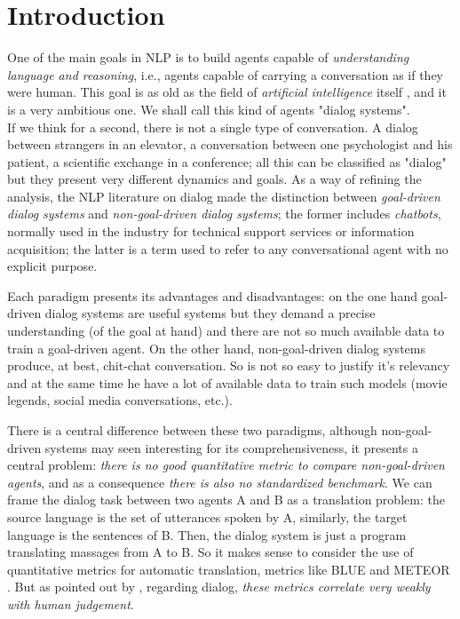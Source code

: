 \chapter{Introduction}
\label{ch:01-introduction}

One of the main goals in NLP is to build agents capable of \textit{understanding language and reasoning}, i.e., agents capable of carrying a conversation as if they were human. This goal is as old as the field of \textit{artificial intelligence} itself \cite{Turing}, and it is a very ambitious one. We shall call this kind of agents "dialog systems".\\

If we think for a second, there is not a single type of conversation. A dialog between strangers in an elevator, a conversation between one psychologist and his patient, a scientific exchange in a conference; all this can be classified as "dialog" but they present very different dynamics and goals. As a way of refining the analysis, the NLP literature on dialog made the distinction between \textit{goal-driven dialog systems} and \textit{non-goal-driven dialog systems}; the former includes \textit{chatbots}, normally used in the industry for technical support services or information acquisition; the latter is a term used to refer to any conversational agent with no explicit purpose.

Each paradigm presents its advantages and disadvantages: on the one hand goal-driven dialog systems are useful systems but they demand a precise understanding (of the goal at hand) and there are not so much available data to train a goal-driven agent. On the other hand, non-goal-driven dialog systems produce, at best, chit-chat conversation. So is not so easy to justify it's relevancy and at the same time he have a lot of available data to train such models (movie legends, social media conversations, etc.). 

There is a central difference between these two paradigms, although non-goal-driven systems may seen interesting for its comprehensiveness, it presents a central problem: \textit{there is no good quantitative metric to compare non-goal-driven agents}, and as a consequence \textit{there is also no standardized benchmark}. We can frame the dialog task between two agents A and B as a translation problem: the source language is the set of utterances spoken by A, similarly, the target language is the sentences of B. Then, the dialog system is just a program translating massages from A to B. So it makes sense to consider the use of quantitative metrics for automatic translation, metrics like BLUE \cite{Papineni02bleu:a} and METEOR \cite{Lavie:2007:MAM:1626355.1626389}. But as pointed out by \cite{LiuLSNCP16, LoweSNCP16}, regarding dialog, \textit{these metrics correlate very weakly with human judgement}.

